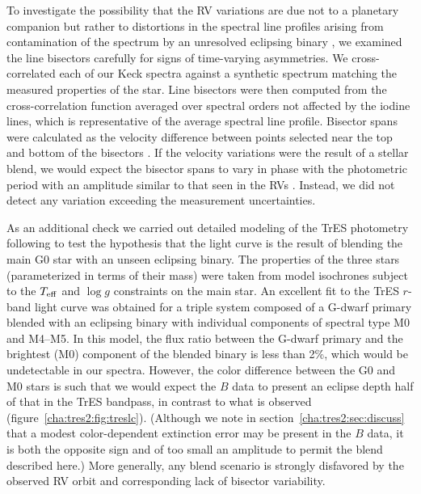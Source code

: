 To investigate the possibility that the RV variations are due not to a
planetary companion but rather to distortions in the spectral line
profiles arising from contamination of the spectrum by an unresolved
eclipsing binary \citep[][]{Santos_Mayor_Naef:aa:2002a,
  Torres_Konacki_Sasselov:apj:2005a}, we examined the line bisectors
carefully for signs of time-varying asymmetries. We cross-correlated
each of our Keck spectra against a synthetic spectrum matching the
measured properties of the star. Line bisectors were then computed
from the cross-correlation function averaged over spectral orders not
affected by the iodine lines, which is representative of the average
spectral line profile.  Bisector spans were calculated as the velocity
difference between points selected near the top and bottom of the
bisectors \citet{Torres_Konacki_Sasselov:apj:2005a}. If the
velocity variations were the result of a stellar blend, we would
expect the bisector spans to vary in phase with the photometric period
with an amplitude similar to that seen in the RVs
\citep{Queloz_Henry_Sivan:aa:2001a, Mandushev_Torres_Latham:apj:2005a}.
 Instead, we did not detect any variation exceeding the measurement uncertainties.

As an additional check we carried out detailed modeling of the TrES
photometry following \citet{Torres_Konacki_Sasselov:apj:2004b} to test
the hypothesis that the light curve is the result of blending the
main G0 star with an unseen eclipsing binary. The properties of the
three stars (parameterized in terms of their mass) were taken from
model isochrones subject to the $T_{\rm eff}$ and $\log{g}$
constraints on the main star. An 
excellent fit to the TrES $r$-band light curve was obtained for a
triple system composed of a G-dwarf primary blended with an
eclipsing binary with individual components of spectral type M0 and
M4--M5.  In this model, the flux ratio between the G-dwarf primary
and the brightest (M0) component of the blended binary is less than
2\%, which would be undetectable in our spectra.
However, the color difference between the G0 and M0 stars is
such that we would expect the $B$ data to present an eclipse depth
half of that in the TrES bandpass, in contrast to what is observed
(figure~\ref{cha:tres2:fig:treslc}). (Although we note in section~\ref{cha:tres2:sec:discuss}
that a modest color-dependent extinction error may be present in the $B$ data, 
it is both the opposite sign and of too small an amplitude to permit the 
blend described here.)  More generally, any blend scenario is strongly 
disfavored by the observed RV orbit and corresponding lack of bisector 
variability.

